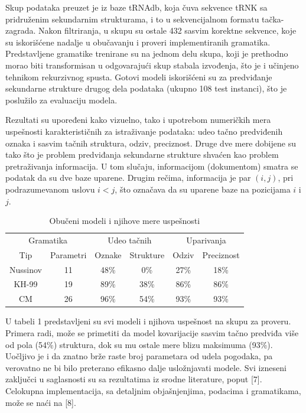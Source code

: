 \documentclass[a4paper, 12pt]{article}
\begin{document}
Skup podataka preuzet je iz baze tRNAdb, koja čuva sekvence tRNK sa pridruženim sekundarnim strukturama, i to u sekvencijalnom formatu tačka-zagrada. Nakon filtriranja, u skupu su ostale 432 sasvim korektne sekvence, koje su iskorišćene nadalje u obučavanju i proveri implementiranih gramatika. Predstavljene gramatike trenirane su na jednom delu skupa, koji je prethodno morao biti transformisan u odgovarajući skup stabala izvođenja, što je i učinjeno tehnikom rekurzivnog spusta. Gotovi modeli iskorišćeni su za predviđanje sekundarne strukture drugog dela podataka (ukupno 108 test instanci), što je poslužilo za evaluaciju modela.

Rezultati su upoređeni kako vizuelno, tako i upotrebom numeričkih mera uspešnosti karakterističnih za istraživanje podataka: udeo tačno predviđenih oznaka i sasvim tačnih struktura, odziv, preciznost. Druge dve mere dobijene su tako što je problem predviđanja sekundarne strukture shvaćen kao problem pretraživanja informacija. U tom slučaju, informacijom (dokumentom) smatra se podatak da su dve baze uparene. Drugim rečima, informacija je par $(i, j)$, pri podrazumevanom uslovu $i < j$, što označava da su uparene baze na pozicijama $i$ i $j$.

\begin{table}[h!]
    \centering
    \caption{Obučeni modeli i njihove mere uspešnosti}
    \begin{tabular}{c c | c c | c c}
        \multicolumn{2}{c}{Gramatika} & \multicolumn{2}{|c|}{Udeo tačnih} & \multicolumn{2}{c}{Uparivanja} \\
        Tip & Parametri & Oznake & Strukture & Odziv & Preciznost \\ \hline
        Nussinov & 11 & 48\% & 0\% & 27\% & 18\% \\
        KH-99 & 19 & 89\% & 38\% & 86\% & 86\% \\
        CM & 26 & 96\% & 54\% & 93\% & 93\%
  \end{tabular}
\end{table}

U tabeli 1 predstavljeni su svi modeli i njihova uspešnost na skupu za proveru. Primera radi, može se primetiti da model kovarijacije sasvim tačno predviđa više od pola (54\%) struktura, dok su mu ostale mere blizu maksimuma (93\%). Uočljivo je i da znatno brže raste broj parametara od udela pogodaka, pa verovatno ne bi bilo preterano efikasno dalje usložnjavati modele. Svi izneseni zaključci u saglasnosti su sa rezultatima iz srodne literature, poput [7]. Celokupna implementacija, sa detaljnim objašnjenjima, podacima i gramatikama, može se naći na [8].
\end{document}
